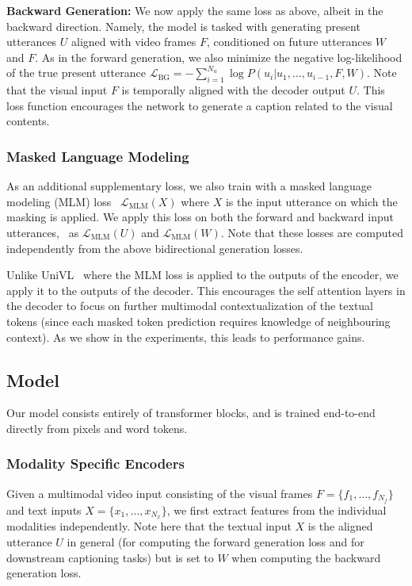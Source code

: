 \documentclass[10pt,twocolumn,letterpaper]{article}
\begin{document}
\noindent\textbf{Backward Generation:}
We now apply the same loss as above, albeit in the backward direction. 
Namely, the model is tasked with generating present utterances $U$ aligned with video frames $F$, conditioned on future utterances $W$ and $F$.
As in the forward generation, we also minimize the negative log-likelihood of the true present utterance $\mathcal{L}_\mathrm{BG}=-\sum_{i=1}^{N_u}\log P(u_i|u_1,\dots,u_{i-1}, F, W)$.
Note that the visual input $F$ is temporally aligned with the decoder output $U$.
This loss function encourages the network to generate a caption related to the visual contents.

\subsubsection{Masked Language Modeling}
\label{sec:mlm}
As an additional supplementary loss, we also train with a masked language modeling (MLM) loss~\cite{devlin2018bert}
$\mathcal{L}_\mathrm{MLM}(X)$ where $X$ is the input utterance on which the masking is applied.
We apply this loss on both the forward and backward input utterances, \ie\ as $\mathcal{L}_\mathrm{MLM}(U)$ and $\mathcal{L}_\mathrm{MLM}(W)$.
Note that these losses are computed independently from the above bidirectional generation losses.

Unlike UniVL~\cite{luo2020univl} where the MLM loss is applied to the outputs of the encoder, we apply it to the outputs of the decoder. This encourages the self attention layers in the decoder to focus on further multimodal contextualization of the textual tokens (since each masked token prediction requires knowledge of neighbouring context). As we show in the experiments, this leads to performance gains.






\subsection{Model} \label{sec:architecture}
Our model consists entirely of transformer blocks, and is trained end-to-end directly from pixels and word tokens. 

\subsubsection{Modality Specific Encoders}
Given a multimodal video input consisting of the visual frames $F=\{f_1,\dots,f_{N_f}\}$ and text inputs $X=\{x_1,\dots,x_{N_x}\}$, we first extract features from the individual modalities independently. 
Note here that the textual input $X$ is the aligned utterance $U$ in general (for computing the forward generation loss and for downstream captioning tasks) but is set to $W$ when computing the backward generation loss.
\end{document}
